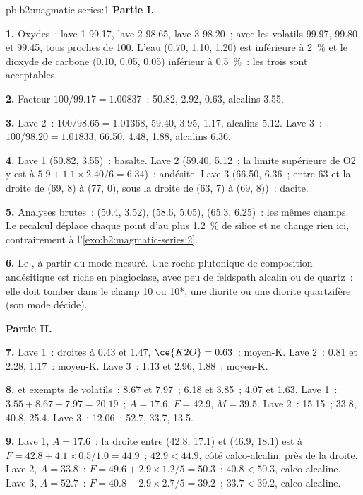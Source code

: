 \begin{solution}{pb:b2:magmatic-series:1}
\noindent\textbf{Partie I.}

\textbf{1.} Oxydes~: lave 1 99.17, lave 2 98.65, lave 3 98.20~; avec les volatils
99.97, 99.80 et 99.45, tous proches de 100. L'eau (0.70, 1.10, 1.20) est inférieure à
\qty{2}{\percent} et le dioxyde de carbone (0.10, 0.05, 0.05) inférieur à \qty{0.5}{\percent}~: les
trois sont acceptables.

\textbf{2.} Facteur $100/99.17 = 1.00837$~:  50.82,  2.92, 
0.63, alcalins 3.55.

\textbf{3.} Lave 2~: $100/98.65 = 1.01368$,  59.40,  3.95, 
1.17, alcalins 5.12. Lave 3~: $100/98.20 = 1.01833$,  66.50,  4.48,
 1.88, alcalins 6.36.

\textbf{4.} Lave 1 (50.82, 3.55)~: basalte. Lave 2 (59.40, 5.12~; la limite supérieure de O2 y est à
$5.9 + 1.1\times2.40/6 = 6.34$)~: andésite. Lave 3 (66.50, 6.36~; entre 63 et la droite de (69, 8)
à (77, 0), sous la droite de (63, 7) à (69, 8))~: dacite.

\textbf{5.} Analyses brutes~: (50.4, 3.52), (58.6, 5.05), (65.3, 6.25)~: les mêmes champs. Le
recalcul déplace chaque point d'au plus \qty{1.2}{\percent} de silice et ne change
rien ici, contrairement à l'\cref{exo:b2:magmatic-series:2}.

\textbf{6.} Le , à partir du mode mesuré. Une roche plutonique de composition andésitique est riche
en plagioclase, avec peu de feldspath alcalin ou de quartz~: elle doit tomber dans le champ 10 ou 10*,
une diorite ou une diorite quartzifère (son mode décide).

\noindent\textbf{Partie II.}

\textbf{7.} Lave 1~: droites à 0.43 et 1.47, $\ce{K2O} = 0.63$~: moyen-K. Lave 2~: 0.81
et 2.28, 1.17~: moyen-K. Lave 3~: 1.13 et 2.96, 1.88~: moyen-K.

\textbf{8.}  et  exempts de volatils~: 8.67 et 7.97~; 6.18 et 3.85~; 4.07
et 1.63. Lave 1~: $3.55 + 8.67 + 7.97 = 20.19$~; $A = 17.6$, $F = 42.9$, $M = 39.5$.
Lave 2~: 15.15~; 33.8, 40.8, 25.4. Lave 3~: 12.06~; 52.7, 33.7, 13.5.

\textbf{9.} Lave 1, $A = 17.6$~: la droite entre (42.8, 17.1) et (46.9, 18.1) est à
$F = 42.8 + 4.1\times0.5/1.0 = 44.9$~; $42.9 < 44.9$, côté calco-alcalin, près de la
droite. Lave 2, $A = 33.8$~: $F = 49.6 + 2.9\times1.2/5 = 50.3$~; $40.8 < 50.3$,
calco-alcaline. Lave 3, $A = 52.7$~: $F = 40.8 - 2.9\times2.7/5 = 39.2$~; $33.7 < 39.2$,
calco-alcaline.


\end{solution}

